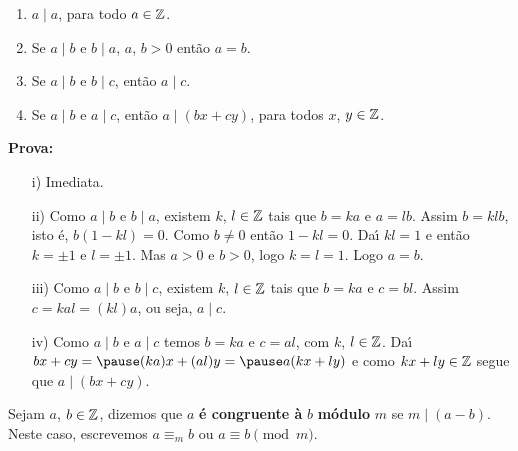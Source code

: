 \documentclass{beamer}
\begin{document}
    \begin{frame}
        \begin{proposicao}
            \begin{enumerate}[label={\roman*})]
                \item $a\mid a$, para todo $a \in \mathbb{Z}$.\pause \vspace{.3cm}
                \item Se $a\mid b$ e $b\mid a$, $a$, $b > 0$ ent\~ao $a = b$.\pause \vspace{.3cm}
                \item Se $a\mid b$ e $b\mid c$, ent{\~a}o $a\mid c$.\pause \vspace{.3cm}
                \item Se $a\mid b$ e $a\mid c$, ent{\~a}o $a\mid (bx+cy)$, para todos $x$, $y \in \mathbb{Z}$.\pause \vspace{.3cm}
            \end{enumerate}
        \end{proposicao}
        \noindent \textbf{Prova:}
        \begin{enumerate}
            \item[i)] Imediata.\pause \vspace{.3cm}

            \item[ii)] Como $a\mid b$ e $b\mid a$, \pause existem $k$, $l \in \mathbb{Z} $ \pause tais que $b = ka$ \pause e $a = lb$. \pause Assim $b = klb$, \pause isto \'e, $b(1 - kl) = 0$. \pause Como $b \ne 0$ \pause ent\~ao $1 - kl = 0$. \pause Da{\'\i} $kl = 1$ \pause e ent\~ao $k = \pm 1$ \pause e $l = \pm 1$. \pause Mas $a > 0$ e $b > 0$, \pause logo $k = l =1$. \pause Logo $a = b$.\pause \vspace{.3cm}
        \end{enumerate}
    \end{frame}
    \begin{frame}
        \begin{enumerate}
            \item[iii)] Como $a\mid b$ e $b\mid c$, \pause existem $k$, $l \in \mathbb{Z}$ \pause tais que $b = ka$ \pause e $c = bl$. \pause Assim  $c = kal = (kl)a$, \pause ou seja, $a\mid c$.\pause \vspace{.3cm}

            \item[iv)] Como $a\mid b$ e $a\mid c$ \pause temos $b = ka$ e $c = al$, \pause com $k$, $l \in \mathbb{Z}$. \pause Da{\'\i} $bx + cy = \pause (ka)x + (al)y = \pause a(kx + ly)$ \pause e como $kx + ly \in \mathbb{Z}$ \pause segue que $a \mid (bx + cy)$.\hspace{.5cm} \qedsymbol\pause
        \end{enumerate}

        \begin{definicao}
            Sejam $a$, $b \in\mathbb{Z}$, \pause dizemos que $a$ \textbf{{\'e} congruente \`a} $b$ \pause \textbf{m{\'o}dulo} $m$ \pause se $m \mid (a-b)$. \pause Neste caso, escrevemos $a\equiv_{m} b$ \pause ou $a\equiv b \pmod{m}$.\pause
        \end{definicao}
    \end{frame}
\end{document}
